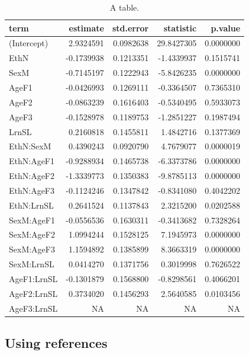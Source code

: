 \documentclass[
]{article}
\begin{document}
\begin{table}
\caption{A table.}\tabularnewline

\centering
\begin{tabular}[t]{l|r|r|r|r}
\hline
term & estimate & std.error & statistic & p.value\\
\hline
(Intercept) & 2.9324591 & 0.0982638 & 29.8427305 & 0.0000000\\
\hline
EthN & -0.1739938 & 0.1213351 & -1.4339937 & 0.1515741\\
\hline
SexM & -0.7145197 & 0.1222943 & -5.8426235 & 0.0000000\\
\hline
AgeF1 & -0.0426993 & 0.1269111 & -0.3364507 & 0.7365310\\
\hline
AgeF2 & -0.0863239 & 0.1616403 & -0.5340495 & 0.5933073\\
\hline
AgeF3 & -0.1528978 & 0.1189753 & -1.2851227 & 0.1987494\\
\hline
LrnSL & 0.2160818 & 0.1455811 & 1.4842716 & 0.1377369\\
\hline
EthN:SexM & 0.4390243 & 0.0920790 & 4.7679077 & 0.0000019\\
\hline
EthN:AgeF1 & -0.9288934 & 0.1465738 & -6.3373786 & 0.0000000\\
\hline
EthN:AgeF2 & -1.3339773 & 0.1350383 & -9.8785113 & 0.0000000\\
\hline
EthN:AgeF3 & -0.1124246 & 0.1347842 & -0.8341080 & 0.4042202\\
\hline
EthN:LrnSL & 0.2641524 & 0.1137843 & 2.3215200 & 0.0202588\\
\hline
SexM:AgeF1 & -0.0556536 & 0.1630311 & -0.3413682 & 0.7328264\\
\hline
SexM:AgeF2 & 1.0994244 & 0.1528125 & 7.1945973 & 0.0000000\\
\hline
SexM:AgeF3 & 1.1594892 & 0.1385899 & 8.3663319 & 0.0000000\\
\hline
SexM:LrnSL & 0.0414270 & 0.1371756 & 0.3019998 & 0.7626522\\
\hline
AgeF1:LrnSL & -0.1301879 & 0.1568800 & -0.8298561 & 0.4066201\\
\hline
AgeF2:LrnSL & 0.3734020 & 0.1456293 & 2.5640585 & 0.0103456\\
\hline
AgeF3:LrnSL & NA & NA & NA & NA\\
\hline
\end{tabular}
\end{table}

\hypertarget{using-references}{%
\subsection*{Using references}\label{using-references}}
\end{document}
